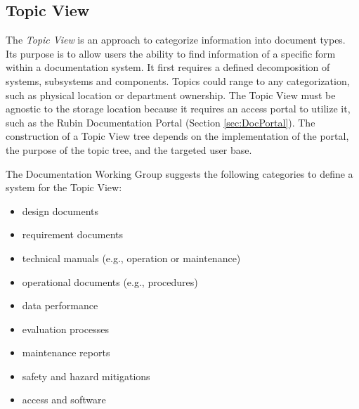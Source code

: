 \subsection{Topic View}

The \emph{Topic View} is an approach to categorize information into document types.
Its purpose is to allow users the ability to find information of a specific form within a documentation system.
It first requires a defined decomposition of systems, subsystems and components.
Topics could range to any categorization, such as physical location or department ownership.
The Topic View must be agnostic to the storage location because it requires an access portal to utilize it, such as the Rubin Documentation Portal (Section \ref{sec:DocPortal}).
The construction of a Topic View tree depends on the implementation of the portal, the purpose of the topic tree, and the targeted user base.

The Documentation Working Group suggests the following categories to define a system for the Topic View:

\begin{itemize}
\item design documents
\item requirement documents
\item technical manuals (e.g., operation or maintenance)
\item operational documents (e.g., procedures)
\item data performance
\item evaluation processes
\item maintenance reports
\item safety and hazard mitigations
\item access and software
\end{itemize}
